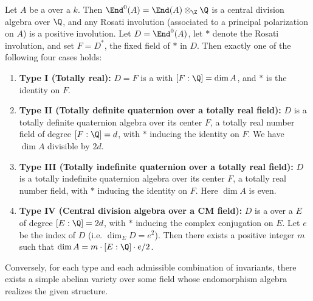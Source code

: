\begin{theorem} \label{theorem:alberts_classification_of_simple_abelian_varieties_over_a_field}
    Let $A$ be a  over a  $k$. Then $\End^0(A) = \End(A) \otimes_{\Z} \Q$ is a central division algebra over $\Q$, and any Rosati involution (associated to a principal polarization on $A$) is a positive involution. Let $D = \End^0(A)$, let $*$ denote the Rosati involution, and set $F = D^{*}$, the fixed field of $*$ in $D$. Then exactly one of the following four cases holds:

    \begin{enumerate}
        \item \textbf{Type I (Totally real):} $D = F$ is a  with $[F:\Q] = \dim A$, and $*$ is the identity on $F$.

        \item \textbf{Type II (Totally definite quaternion over a totally real field):} $D$ is a totally definite quaternion algebra over its center $F$, a totally real number field of degree $[F:\Q] = d$, with $*$ inducing the identity on $F$. We have $\dim A$ divisible by $2d$.

        \item \textbf{Type III (Totally indefinite quaternion over a totally real field):} $D$ is a totally indefinite quaternion algebra over its center $F$, a totally real number field, with $*$ inducing the identity on $F$. Here $\dim A$ is even.

        \item \textbf{Type IV (Central division algebra over a CM field):} $D$ is a    over a  $E$ of degree $[E:\Q] = 2d$, with $*$ inducing the complex conjugation on $E$. Let $e$ be the index of $D$ (i.e. $\dim_E D = e^2$). Then there exists a positive integer $m$ such that $\dim A = m \cdot [E:\Q] \cdot e / 2$.
    \end{enumerate}

    Conversely, for each type and each admissible combination of invariants, there exists a simple abelian variety over some field whose endomorphism algebra realizes the given structure.
\end{theorem}
